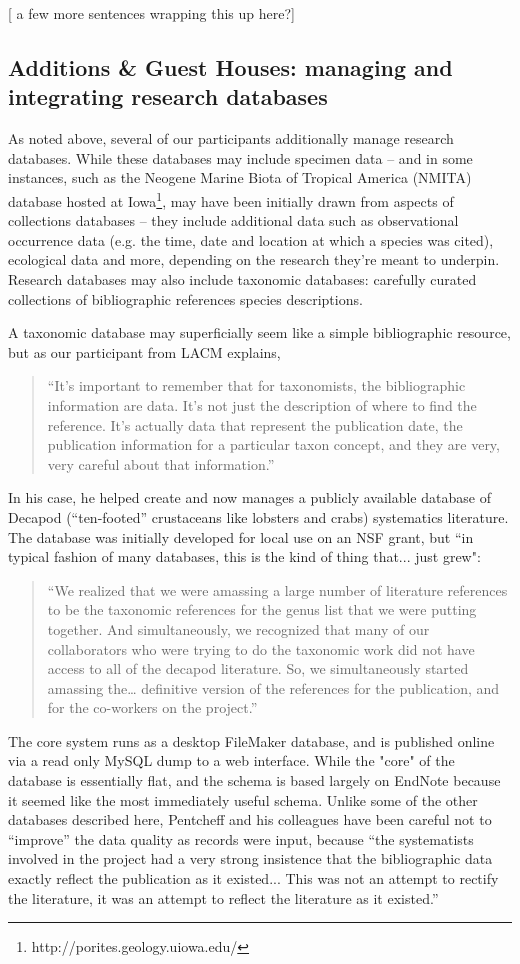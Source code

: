 [ a few more sentences wrapping this up here?]

\subsection{Additions \& Guest Houses: managing and integrating research databases}

As noted above, several of our participants additionally manage research databases. While these databases may include specimen data -- and in some instances, such as the Neogene Marine Biota of Tropical America (NMITA) database hosted at Iowa\footnote{http://porites.geology.uiowa.edu/}, may have been initially drawn from aspects of collections databases -- they include additional data such as observational occurrence data (e.g. the time, date and location at which a species was cited), ecological data and more, depending on the research they're meant to underpin. Research databases may also include taxonomic databases: carefully curated collections of bibliographic references species descriptions. 

A taxonomic database may superficially seem like a simple bibliographic resource, but as our participant from LACM explains,
\begin{quote}
“It’s important to remember that for taxonomists, the bibliographic information are data. It's not just the description of where to find the reference. It's actually data that represent the publication date, the publication information for a particular taxon concept, and they are very, very careful about that information.”
\end{quote}
In his case, he helped create and now manages a publicly available database of Decapod (“ten-footed” crustaceans like lobsters and crabs) systematics literature. The database was initially developed for local use on an NSF grant, but “in typical fashion of many databases, this is the kind of thing that... just grew":
\begin{quote}
“We realized that we were amassing a large number of literature references to be the taxonomic references for the genus list that we were putting together. And simultaneously, we recognized that many of our collaborators who were trying to do the taxonomic work did not have access to all of the decapod literature. So, we simultaneously started amassing the… definitive version of the references for the publication, and for the co-workers on the project.”
\end{quote}
The core system runs as a desktop FileMaker database, and is published online via a read only MySQL dump to a web interface. While the "core" of the database is essentially flat, and the schema is based largely on EndNote because it seemed like the most immediately useful schema. Unlike some of the other databases described here, Pentcheff and his colleagues have been careful not to “improve” the data quality as records were input, because “the systematists involved in the project had a very strong insistence that the bibliographic data exactly reflect the publication as it existed... This was not an attempt to rectify the literature, it was an attempt to reflect the literature as it existed.” 

